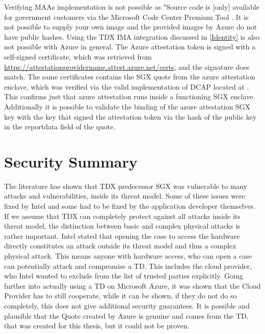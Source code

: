 Verifying MAAs implementation is not possible as \guillemotright"Source code is [only] available for government customers via the Microsoft Code Center Premium Tool \guillemotleft \cite{dan_mabee_azure_attestation_2023}. It is not possible to supply your own image and the provided images by Azure do not have public hashes. Using the TDX IMA integration discussed in \ref{Identity} is also not possible with Azure in general.
The Azure attestation token is signed with a self-signed certificate, which was retrieved from \url{https://attestationprovidername.attest.azure.net/certs}, and the signature does match. The same certificates contains the \Gls{SGX} quote from the azure attestation enclave, which was verified via the valid implementation of DCAP located at \cite{microsoft_corporation_azure-samplesmicrosoft-azure-attestation_nodate}. This confirms just that azure attestation runs inside a functioning \Gls{SGX} enclave. Additionally it is possible to validate the binding of the azure attestation \Gls{SGX} key with the key that signed the attestation token via the hash of the public key in the reportdata field of the quote.

\section{Security Summary}

The literature has shown that TDX predecessor \Gls{SGX} was vulnerable to many attacks and vulnerabilities, inside its threat model. Some of these issues were fixed by Intel and some had to be fixed by the application developer themselves. If we assume that TDX can completely protect against all attacks inside its threat model, the distinction between basic and complex physical attacks is rather important. Intel stated that opening the case to access the hardware directly constitutes an attack outside its threat model and thus a complex physical attack. This means anyone with hardware access, who can open a case can potentially attack and compromise a TD. This includes the cloud provider, who Intel wanted to exclude from the list of trusted parties explicitly.
Going further into actually using a TD on Microsoft Azure, it was shown that the Cloud Provider has to still cooperate, while it can be shown, if they do not do so completely, this does not give additional security guarantees. It is possible and plausible that the Quote created by Azure is genuine and comes from the TD, that was created for this thesis, but it could not be proven. \todo


